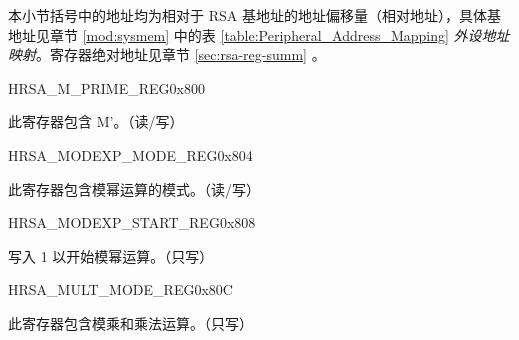 本小节括号中的地址均为相对于 RSA 基地址的地址偏移量（相对地址），具体基地址见章节 \ref{mod:sysmem} \textit{} 中的表 \ref{table:Peripheral_Address_Mapping} \textit{外设地址映射}。寄存器绝对地址见章节 \ref{sec:rsa-reg-summ} \textit{}。


\begin{register}{H}{RSA\_M\_PRIME\_REG}{0x800}\label{regdesc:RSAMPRIMEREG}
%
\regnewline%
\begin{regdesc}\begin{reglist}
\item [RSA\_M\_PRIME\_REG] 此寄存器包含 M'。（读/写）
\end{reglist}\end{regdesc}
\end{register}


\begin{register}{H}{RSA\_MODEXP\_MODE\_REG}{0x804}\label{regdesc:RSAMODEXPMODEREG}
%
%
\regnewline%
\begin{regdesc}\begin{reglist}
\item [RSA\_MODEXP\_MODE] 此寄存器包含模幂运算的模式。（读/写）
\end{reglist}\end{regdesc}
\end{register}


\begin{register}{H}{RSA\_MODEXP\_START\_REG}{0x808}\label{regdesc:RSAMODEXPSTARTREG}
%
%
\regnewline%
\begin{regdesc}\begin{reglist}
\item [RSA\_MODEXP\_START] 写入 1 以开始模幂运算。（只写）
\end{reglist}\end{regdesc}
\end{register}


\begin{register}{H}{RSA\_MULT\_MODE\_REG}{0x80C}\label{regdesc:RSAMULTMODEREG}
%
%
\regnewline%
\begin{regdesc}\begin{reglist}
\item [RSA\_MULT\_MODE] 此寄存器包含模乘和乘法运算。（只写）
\end{reglist}\end{regdesc}
\end{register}


